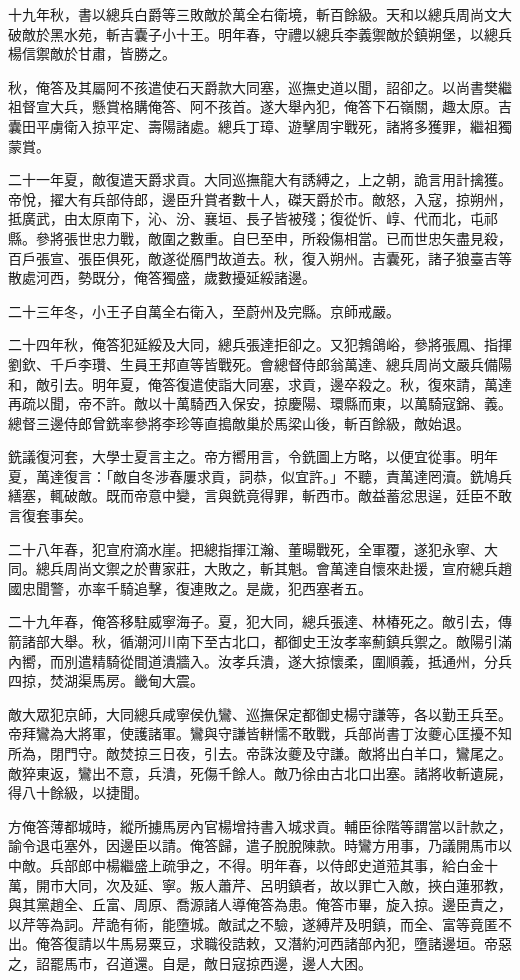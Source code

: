 \begin{pinyinscope}
十九年秋，書以總兵白爵等三敗敵於萬全右衛境，斬百餘級。天和以總兵周尚文大破敵於黑水苑，斬吉囊子小十王。明年春，守禮以總兵李義禦敵於鎮朔堡，以總兵楊信禦敵於甘肅，皆勝之。

秋，俺答及其屬阿不孩遣使石天爵款大同塞，巡撫史道以聞，詔卻之。以尚書樊繼祖督宣大兵，懸賞格購俺答、阿不孩首。遂大舉內犯，俺答下石嶺關，趣太原。吉囊田平虜衛入掠平定、壽陽諸處。總兵丁璋、遊擊周宇戰死，諸將多獲罪，繼祖獨蒙賞。

二十一年夏，敵復遣天爵求貢。大同巡撫龍大有誘縛之，上之朝，詭言用計擒獲。帝悅，擢大有兵部侍郎，邊臣升賞者數十人，磔天爵於市。敵怒，入寇，掠朔州，抵廣武，由太原南下，沁、汾、襄垣、長子皆被殘；復從忻、崞、代而北，屯祁縣。參將張世忠力戰，敵圍之數重。自巳至申，所殺傷相當。已而世忠矢盡見殺，百戶張宣、張臣俱死，敵遂從鴈門故道去。秋，復入朔州。吉囊死，諸子狼臺吉等散處河西，勢既分，俺答獨盛，歲數擾延綏諸邊。

二十三年冬，小王子自萬全右衛入，至蔚州及完縣。京師戒嚴。

二十四年秋，俺答犯延綏及大同，總兵張達拒卻之。又犯鵓鴿峪，參將張鳳、指揮劉欽、千戶李瓚、生員王邦直等皆戰死。會總督侍郎翁萬達、總兵周尚文嚴兵備陽和，敵引去。明年夏，俺答復遣使詣大同塞，求貢，邊卒殺之。秋，復來請，萬達再疏以聞，帝不許。敵以十萬騎西入保安，掠慶陽、環縣而東，以萬騎寇錦、義。總督三邊侍郎曾銑率參將李珍等直搗敵巢於馬梁山後，斬百餘級，敵始退。

銑議復河套，大學士夏言主之。帝方嚮用言，令銑圖上方略，以便宜從事。明年夏，萬達復言：「敵自冬涉春屢求貢，詞恭，似宜許。」不聽，責萬達罔瀆。銑鳩兵繕塞，輒破敵。既而帝意中變，言與銑竟得罪，斬西市。敵益蓄忿思逞，廷臣不敢言復套事矣。

二十八年春，犯宣府滴水崖。把總指揮江瀚、董暘戰死，全軍覆，遂犯永寧、大同。總兵周尚文禦之於曹家莊，大敗之，斬其魁。會萬達自懷來赴援，宣府總兵趙國忠聞警，亦率千騎追擊，復連敗之。是歲，犯西塞者五。

二十九年春，俺答移駐威寧海子。夏，犯大同，總兵張達、林椿死之。敵引去，傳箭諸部大舉。秋，循潮河川南下至古北口，都御史王汝孝率薊鎮兵禦之。敵陽引滿內嚮，而別遣精騎從間道潰牆入。汝孝兵潰，遂大掠懷柔，圍順義，抵通州，分兵四掠，焚湖渠馬房。畿甸大震。

敵大眾犯京師，大同總兵咸寧侯仇鸞、巡撫保定都御史楊守謙等，各以勤王兵至。帝拜鸞為大將軍，使護諸軍。鸞與守謙皆軿懦不敢戰，兵部尚書丁汝夔心匡擾不知所為，閉門守。敵焚掠三日夜，引去。帝誅汝夔及守謙。敵將出白羊口，鸞尾之。敵猝東返，鸞出不意，兵潰，死傷千餘人。敵乃徐由古北口出塞。諸將收斬遺屍，得八十餘級，以捷聞。

方俺答薄都城時，縱所擄馬房內官楊增持書入城求貢。輔臣徐階等謂當以計款之，諭令退屯塞外，因邊臣以請。俺答歸，遣子脫脫陳款。時鸞方用事，乃議開馬市以中敵。兵部郎中楊繼盛上疏爭之，不得。明年春，以侍郎史道蒞其事，給白金十萬，開市大同，次及延、寧。叛人蕭芹、呂明鎮者，故以罪亡入敵，挾白蓮邪教，與其黨趙全、丘富、周原、喬源諸人導俺答為患。俺答市畢，旋入掠。邊臣責之，以芹等為詞。芹詭有術，能墮城。敵試之不驗，遂縛芹及明鎮，而全、富等竟匿不出。俺答復請以牛馬易粟豆，求職役誥敕，又潛約河西諸部內犯，墮諸邊垣。帝惡之，詔罷馬市，召道還。自是，敵日寇掠西邊，邊人大困。


\end{pinyinscope}
